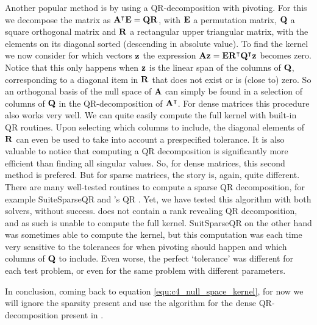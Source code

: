 Another popular\cite{trefethen_numerical_1997} method is by using a QR-decomposition with pivoting. For this we decompose the matrix as ${\vb{A}}^\intercal\vb{E} = \vb{Q} \vb{R}$, with $\vb{E}$ a permutation matrix, $\vb{Q}$ a square orthogonal matrix and $\vb{R}$ a rectangular upper triangular matrix, with the elements on its diagonal sorted (descending in absolute value). To find the kernel we now consider for which vectors $\vb{z}$ the expression $\vb{A} \vb{z} = \vb{E}{\vb{R}}^\intercal{\vb{Q}}^\intercal\vb{z}$ becomes zero. Notice that this only happens when $\vb{z}$ is the linear span of the columns of $\vb{Q}$, corresponding to a diagonal item in $\vb{R}$ that does not exist or is (close to) zero. So an orthogonal basis of the null space of $\vb{A}$ can simply be found in a selection of columns of $\vb{Q}$ in the QR-decomposition of ${\vb{A}}^\intercal$. For dense matrices this procedure also works very well. We can quite easily compute the full kernel with built-in QR routines. Upon selecting which columns to include, the diagonal elements of $\vb{R}$ can even be used to take into account a prespecified tolerance. It is also valuable to notice that computing a QR decomposition is significantly more efficient than finding all singular values. So, for dense matrices, this second method is prefered. But for sparse matrices, the story is, again, quite different. There are many well-tested routines to compute a sparse QR decomposition, for example SuiteSparseQR \cite{davis_algorithm_2011} and \Eigen's QR \cite{guennebaud_eigen_2010}. Yet, we have tested this algorithm with both solvers, without success. \Eigen does not contain a rank revealing QR decomposition, and as such is unable to compute the full kernel. SuitSparseQR on the other hand was sometimes able to compute the kernel, but this computation was each time very sensitive to the tolerances for when pivoting should happen and which columns of $\vb{Q}$ to include. Even worse, the perfect `tolerance' was different for each test problem, or even for the same problem with different parameters.

In conclusion, coming back to equation \eqref{equ:c4_null_space_kernel}, for now we will ignore the sparsity present and use the algorithm for the dense QR-decomposition present in \Eigen \cite{guennebaud_eigen_2010}.

